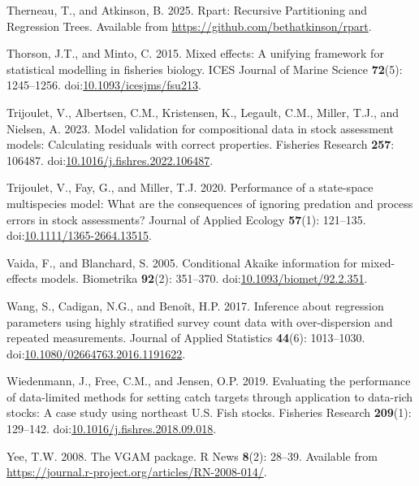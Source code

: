 \documentclass[
  12pt,
]{article}
\newlength{\cslhangindent}
\newenvironment{CSLReferences}[2] %
 {\begin{list}{}{%
  \setlength{\itemindent}{0pt}
  \setlength{\leftmargin}{0pt}
  \setlength{\parsep}{0pt}
  \ifodd #1
   \setlength{\leftmargin}{\cslhangindent}
   \setlength{\itemindent}{-1\cslhangindent}
  \fi
  \setlength{\itemsep}{#2\baselineskip}}}
 {\end{list}}
\begin{document}
\begin{CSLReferences}{1}{0}
Therneau, T., and Atkinson, B. 2025. Rpart: {R}ecursive {P}artitioning
and {R}egression {T}rees. Available from
\url{https://github.com/bethatkinson/rpart}.

Thorson, J.T., and Minto, C. 2015. Mixed effects: A unifying framework
for statistical modelling in fisheries biology. ICES Journal of Marine
Science \textbf{72}(5): 1245--1256.
doi:\href{https://doi.org/10.1093/icesjms/fsu213}{10.1093/icesjms/fsu213}.

Trijoulet, V., Albertsen, C.M., Kristensen, K., Legault, C.M., Miller,
T.J., and Nielsen, A. 2023. Model validation for compositional data in
stock assessment models: Calculating residuals with correct properties.
Fisheries Research \textbf{257}: 106487.
doi:\href{https://doi.org/10.1016/j.fishres.2022.106487}{10.1016/j.fishres.2022.106487}.

Trijoulet, V., Fay, G., and Miller, T.J. 2020. Performance of a
state-space multispecies model: What are the consequences of ignoring
predation and process errors in stock assessments? Journal of Applied
Ecology \textbf{57}(1): 121--135.
doi:\href{https://doi.org/10.1111/1365-2664.13515}{10.1111/1365-2664.13515}.

Vaida, F., and Blanchard, S. 2005. Conditional {A}kaike information for
mixed-effects models. Biometrika \textbf{92}(2): 351--370.
doi:\href{https://doi.org/10.1093/biomet/92.2.351}{10.1093/biomet/92.2.351}.

Wang, S., Cadigan, N.G., and Benoît, H.P. 2017. Inference about
regression parameters using highly stratified survey count data with
over-dispersion and repeated measurements. Journal of Applied Statistics
\textbf{44}(6): 1013--1030.
doi:\href{https://doi.org/10.1080/02664763.2016.1191622}{10.1080/02664763.2016.1191622}.

Wiedenmann, J., Free, C.M., and Jensen, O.P. 2019. Evaluating the
performance of data-limited methods for setting catch targets through
application to data-rich stocks: A case study using northeast {U.S.}
Fish stocks. Fisheries Research \textbf{209}(1): 129--142.
doi:\href{https://doi.org/10.1016/j.fishres.2018.09.018}{10.1016/j.fishres.2018.09.018}.

Yee, T.W. 2008. The {VGAM} package. R News \textbf{8}(2): 28--39.
Available from
\url{https://journal.r-project.org/articles/RN-2008-014/}.


\end{CSLReferences}
\end{document}
